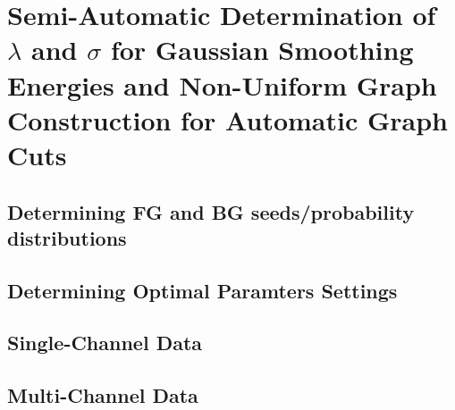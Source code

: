 
\chapter{Semi-Automatic Determination of $\lambda$ and $\sigma$ for Gaussian Smoothing Energies and Non-Uniform Graph Construction for Automatic Graph Cuts} %

\label{chap:Chapter5} %


\section{Determining FG and BG seeds/probability distributions}



\section{Determining Optimal Paramters Settings}



\section{Single-Channel Data}



\section{Multi-Channel Data}
